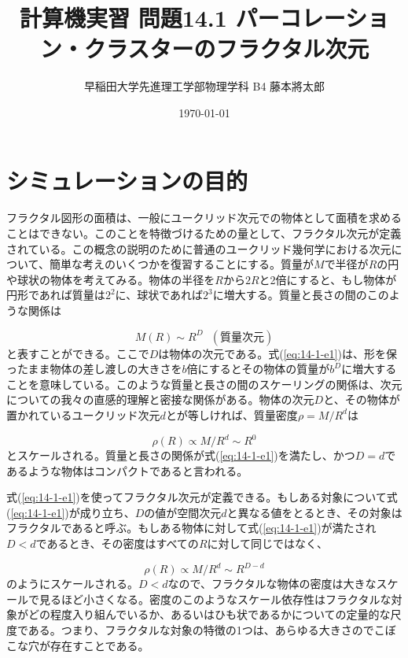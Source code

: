 \documentclass{jsarticle}
\title{計算機実習 問題14.1 パーコレーション・クラスターのフラクタル次元}
\author{早稲田大学先進理工学部物理学科 B4 藤本將太郎}
\date{\today}
\begin{document}
\maketitle
    
    \section{シミュレーションの目的}
        フラクタル図形の面積は、一般にユークリッド次元での物体として面積を求めることはできない。このことを特徴づけるための量として、フラクタル次元が定義されている。この概念の説明のために普通のユークリッド幾何学における次元について、簡単な考えのいくつかを復習することにする。質量が$M$で半径が$R$の円や球状の物体を考えてみる。物体の半径を$R$から$2R$と2倍にすると、もし物体が円形であれば質量は$2^{2}$に、球状であれば$2^{3}$に増大する。質量と長さの間のこのような関係は

        \begin{equation}
            M(R) \sim R^{D}\ \ \ (質量次元)
            \label{eq:14-1-e1}
        \end{equation}
        と表すことができる。ここで$D$は物体の次元である。式(\ref{eq:14-1-e1})は、形を保ったまま物体の差し渡しの大きさを$b$倍にするとその物体の質量が$b^{D}$に増大することを意味している。このような質量と長さの間のスケーリングの関係は、次元についての我々の直感的理解と密接な関係がある。物体の次元$D$と、その物体が置かれているユークリッド次元$d$とが等しければ、質量密度$\rho = M/R^{d}$は
        
        \begin{equation}
            \rho(R) \propto M/R^{d} \sim R^{0}
            \label{eq:14-1-e2}
        \end{equation}
        とスケールされる。質量と長さの関係が式(\ref{eq:14-1-e1})を満たし、かつ$D=d$であるような物体はコンパクトであると言われる。
        
        式(\ref{eq:14-1-e1})を使ってフラクタル次元が定義できる。もしある対象について式(\ref{eq:14-1-e1})が成り立ち、$D$の値が空間次元$d$と異なる値をとるとき、その対象はフラクタルであると呼ぶ。もしある物体に対して式(\ref{eq:14-1-e1})が満たされ$D < d$であるとき、その密度はすべての$R$に対して同じではなく、
        
        \begin{equation}
            \rho(R) \propto M/R^{d}  \sim R^{D-d}
        \end{equation}
        のようにスケールされる。$D<d$なので、フラクタルな物体の密度は大きなスケールで見るほど小さくなる。密度のこのようなスケール依存性はフラクタルな対象がどの程度入り組んでいるか、あるいはひも状であるかについての定量的な尺度である。つまり、フラクタルな対象の特徴の1つは、あらゆる大きさのでこぼこな穴が存在すことである。
        
\end{document}
